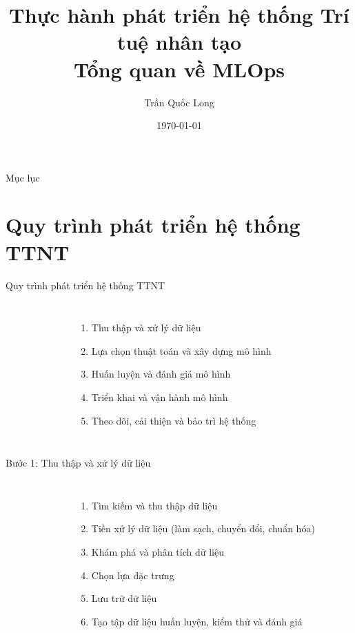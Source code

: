 \documentclass{beamer}
\title{Thực hành phát triển hệ thống Trí tuệ nhân tạo\\
Tổng quan về MLOps
}
\author{Trần Quốc Long}
\institute{Trường ĐH Công nghệ, ĐHQG Hà Nội}
\date{\today}
\begin{document}
\begin{frame}
    \titlepage
\end{frame}

\begin{frame}{Mục lục}
    \tableofcontents
\end{frame}

\section{Quy trình phát triển hệ thống TTNT}

\begin{frame}{Quy trình phát triển hệ thống TTNT}
    \begin{columns}
        \begin{figure}
            \centering
        \end{figure}
        \begin{enumerate}
            \item Thu thập và xử lý dữ liệu
            \item Lựa chọn thuật toán và xây dựng mô hình
            \item Huấn luyện và đánh giá mô hình
            \item Triển khai và vận hành mô hình
            \item Theo dõi, cải thiện và bảo trì hệ thống
        \end{enumerate}
    \end{columns}
\end{frame}

\begin{frame}{Bước 1: Thu thập và xử lý dữ liệu}
    \begin{columns}
        \begin{figure}
            \centering
        \end{figure}
        \begin{enumerate}
            \item Tìm kiếm và thu thập dữ liệu
            \item Tiền xử lý dữ liệu (làm sạch, chuyển đổi, chuẩn hóa)
            \item Khám phá và phân tích dữ liệu
            \item Chọn lựa đặc trưng
            \item Lưu trữ dữ liệu
            \item Tạo tập dữ liệu huấn luyện, kiểm thử và đánh giá
        \end{enumerate}
    \end{columns}
\end{frame}
\end{document}
